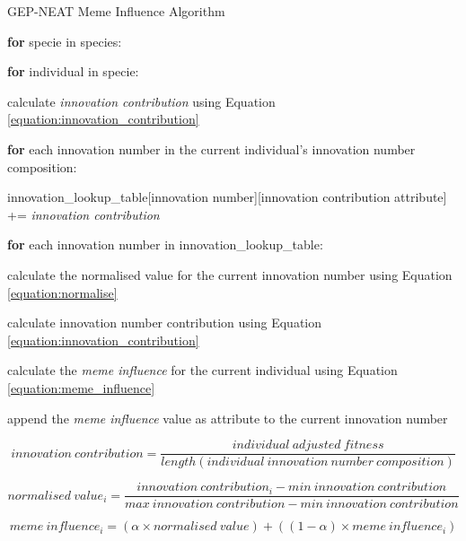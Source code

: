 \begin{algorithm}
	\caption{GEP-NEAT Meme Influence Algorithm}\label{alg:meme_influence}
	\begin{algorithmic}[1]
	\item \textbf{for} specie in species:
	\item \quad \textbf{for} individual in specie:
	\item \quad \quad calculate \textit{innovation contribution} using Equation \ref{equation:innovation_contribution}
	\item \quad \quad \textbf{for} each innovation number in the current individual's innovation number composition:
	\item \quad \quad \quad innovation\_lookup\_table[innovation number][innovation contribution attribute] += \textit{innovation contribution}
	
	\item 

	\item \textbf{for} each innovation number in innovation\_lookup\_table:
	\item \quad calculate the normalised value for the current innovation number using Equation \ref{equation:normalise}
	\item \quad calculate innovation number contribution using Equation \ref{equation:innovation_contribution}
	\item \quad calculate the \textit{meme influence} for the current individual using Equation \ref{equation:meme_influence}
	\item \quad append the \textit{meme influence} value as attribute to the current innovation number
\end{algorithmic}
\end{algorithm}

\begin{equation}\label{equation:innovation_contribution}
    innovation\:contribution = \frac{individual\:adjusted\:fitness}{length(individual\:innovation\:number\:composition)}
\end{equation}

\begin{equation}\label{equation:normalise}
    normalised\:value_i = \frac{innovation\:contribution_i - min\:innovation\:contribution}{max\:innovation\:contribution - min\:innovation\:contribution}
\end{equation}

\begin{equation}\label{equation:meme_influence}
    meme\:influence_i = (\alpha \times normalised\:value) + ((1 - \alpha) \times meme\:influence_i)
\end{equation}


